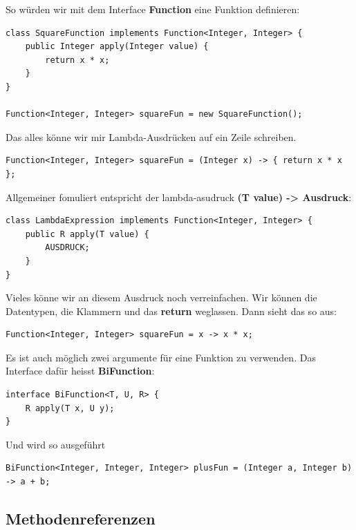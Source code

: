 \documentclass[12pt]{article}
\begin{document}
    So würden wir mit dem Interface \textbf{Function} eine Funktion definieren:

    \begin{lstlisting}
class SquareFunction implements Function<Integer, Integer> {
    public Integer apply(Integer value) {
        return x * x;
    }
}

Function<Integer, Integer> squareFun = new SquareFunction();
    \end{lstlisting}

    Das alles könne wir mir Lambda-Ausdrücken auf ein Zeile schreiben. 

    \begin{lstlisting}
Function<Integer, Integer> squareFun = (Integer x) -> { return x * x };
    \end{lstlisting}

    Allgemeiner fomuliert entspricht der lambda-asudruck \textbf{(T value) -> {Ausdruck}}:

    \begin{lstlisting}
class LambdaExpression implements Function<Integer, Integer> {
    public R apply(T value) {
        AUSDRUCK;
    }
}
    \end{lstlisting}

    Vieles könne wir an diesem Ausdruck noch verreinfachen. Wir können 
    die Datentypen, die Klammern und das \textbf{return} weglassen. 
    Dann sieht das so aus: 

    \begin{lstlisting}
Function<Integer, Integer> squareFun = x -> x * x;
    \end{lstlisting}

    Es ist auch möglich zwei argumente für eine Funktion zu verwenden. 
    Das Interface dafür heisst \textbf{BiFunction}: 

    \begin{lstlisting}
interface BiFunction<T, U, R> {
    R apply(T x, U y);
}
    \end{lstlisting}

    Und wird so ausgeführt
    \begin{lstlisting}
BiFunction<Integer, Integer, Integer> plusFun = (Integer a, Integer b) -> a + b;
    \end{lstlisting}


    \subsection*{Methodenreferenzen}
\end{document}
